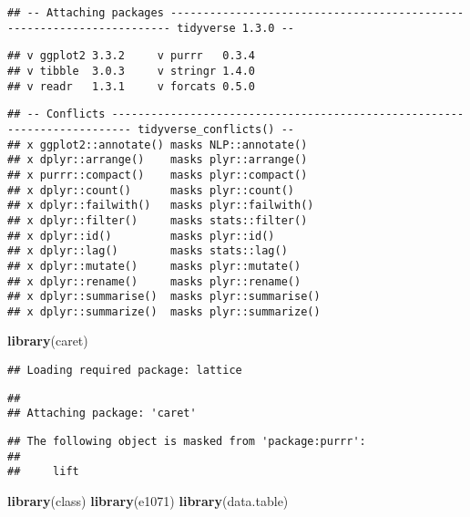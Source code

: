 \documentclass[]{article}
\newenvironment{Shaded}{\begin{snugshade}}{\end{snugshade}}
\newcommand{\KeywordTok}[1]{\textcolor[rgb]{0.13,0.29,0.53}{\textbf{#1}}}
\newcommand{\NormalTok}[1]{#1}
\begin{document}
\begin{verbatim}
## -- Attaching packages ---------------------------------------------------------------------- tidyverse 1.3.0 --
\end{verbatim}

\begin{verbatim}
## v ggplot2 3.3.2     v purrr   0.3.4
## v tibble  3.0.3     v stringr 1.4.0
## v readr   1.3.1     v forcats 0.5.0
\end{verbatim}

\begin{verbatim}
## -- Conflicts ------------------------------------------------------------------------- tidyverse_conflicts() --
## x ggplot2::annotate() masks NLP::annotate()
## x dplyr::arrange()    masks plyr::arrange()
## x purrr::compact()    masks plyr::compact()
## x dplyr::count()      masks plyr::count()
## x dplyr::failwith()   masks plyr::failwith()
## x dplyr::filter()     masks stats::filter()
## x dplyr::id()         masks plyr::id()
## x dplyr::lag()        masks stats::lag()
## x dplyr::mutate()     masks plyr::mutate()
## x dplyr::rename()     masks plyr::rename()
## x dplyr::summarise()  masks plyr::summarise()
## x dplyr::summarize()  masks plyr::summarize()
\end{verbatim}

\begin{Shaded}
\begin{Highlighting}[]
\KeywordTok{library}\NormalTok{(caret)}
\end{Highlighting}
\end{Shaded}

\begin{verbatim}
## Loading required package: lattice
\end{verbatim}

\begin{verbatim}
## 
## Attaching package: 'caret'
\end{verbatim}

\begin{verbatim}
## The following object is masked from 'package:purrr':
## 
##     lift
\end{verbatim}

\begin{Shaded}
\begin{Highlighting}[]
\KeywordTok{library}\NormalTok{(class)}
\KeywordTok{library}\NormalTok{(e1071)}
\KeywordTok{library}\NormalTok{(data.table)}
\end{Highlighting}
\end{Shaded}
\end{document}

